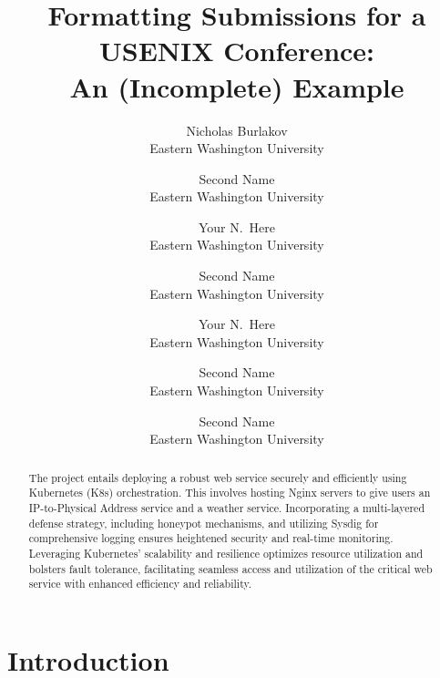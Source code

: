 \documentclass[letterpaper,twocolumn,10pt]{article}
\begin{document}

\date{}

\title{\Large \bf Formatting Submissions for a USENIX Conference:\\
  An (Incomplete) Example}

\author{
{\rm Nicholas Burlakov}\\
Eastern Washington University
\and
{\rm Second Name}\\
Eastern Washington University
\and
{\rm Your N.\ Here}\\
Eastern Washington University
\and
{\rm Second Name}\\
Eastern Washington University
\and
{\rm Your N.\ Here}\\
Eastern Washington University
\and
{\rm Second Name}\\
Eastern Washington University
\and
{\rm Second Name}\\
Eastern Washington University
} %

\maketitle

\begin{abstract}
The project entails deploying a robust web service securely and efficiently using Kubernetes (K8s) orchestration. This involves hosting Nginx servers to give users an IP-to-Physical Address service and a weather service. Incorporating a multi-layered defense strategy, including honeypot mechanisms, and utilizing Sysdig for comprehensive logging ensures heightened security and real-time monitoring. Leveraging Kubernetes' scalability and resilience optimizes resource utilization and bolsters fault tolerance, facilitating seamless access and utilization of the critical web service with enhanced efficiency and reliability.
\end{abstract}


\section{Introduction}

\end{document}
